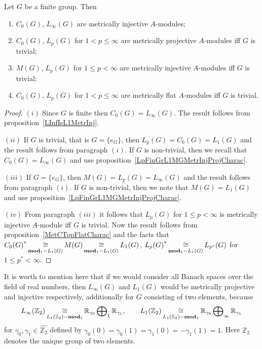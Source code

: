 \begin{proposition}\label{StdModFinGrL1MGMetrInjProjFlatCharac} Let $G$ be a
finite group. Then

\begin{enumerate}[label = (\roman*)]
    \item $C_0(G)$, $L_\infty(G)$ are metrically injective $A$-modules;

    \item $C_0(G)$, $L_p(G)$ for $1<p\leq\infty$ are metrically projective
    $A$-modules iff $G$ is trivial;

    \item $M(G)$, $L_p(G)$ for $1\leq p<\infty$ are metrically injective
    $A$-modules iff $G$ is trivial;

    \item $C_0(G)$, $L_p(G)$ for $1<p\leq\infty$ are metrically 
    flat $A$-modules iff $G$ is trivial.
\end{enumerate}
\end{proposition}
\begin{proof}
$(i)$ Since $G$ is finite then $C_0(G)=L_\infty(G)$. The result follows from
proposition~\ref{LInfIsL1MetrInj}.

$(ii)$ If $G$ is trivial, that is $G= \{e_G \}$, then $L_p(G)=C_0(G)=L_1(G)$ and
the result follows from paragraph $(i)$. If $G$ is non-trivial, then we recall
that $C_0(G)=L_\infty(G)$ and use
proposition~\ref{LpFinGrL1MGMetrInjProjCharac}.

$(iii)$ If $G= \{e_G \}$, then $M(G)=L_p(G)=L_\infty(G)$ and the result follows
from paragraph $(i)$. If $G$ is non-trivial, then we note that $M(G)=L_1(G)$ and
use proposition~\ref{LpFinGrL1MGMetrInjProjCharac}.

$(iv)$ From paragraph $(iii)$ it follows that $L_p(G)$ for $1\leq p<\infty$ is
metrically injective $A$-module iff $G$ is trivial. Now the result follows from
proposition~\ref{MetCTopFlatCharac} and the facts that
${C_0(G)}^*\mathop{\mathbin{\cong}}\limits_{\mathbf{mod}_1-L_1(G)}M(G)\mathop{\mathbin{\cong}}\limits_{\mathbf{mod}_1-L_1(G)}L_1(G)$,
${L_p(G)}^*\mathop{\mathbin{\cong}}\limits_{\mathbf{mod}_1-L_1(G)}L_{p^*}(G)$ for $1\leq p^*<\infty$.
\end{proof}

It is worth to mention here that if we would consider all Banach spaces over the
field of real numbers, then $L_\infty(G)$ and $L_1(G)$ would be metrically
projective and injective respectively,  additionally for $G$ consisting of two
elements, because
$$
L_\infty(\mathbb{Z}_2)
\mathop{\mathbin{\cong}}\limits_{L_1(\mathbb{Z}_2)-\mathbf{mod}_1}
\mathbb{R}_{\gamma_0}\bigoplus\nolimits_1\mathbb{R}_{\gamma_1},
\qquad
L_1(\mathbb{Z}_2)
\mathop{\mathbin{\cong}}\limits_{L_1(\mathbb{Z}_2)-\mathbf{mod}_1}
\mathbb{R}_{\gamma_0}\bigoplus\nolimits_\infty\mathbb{R}_{\gamma_1}
$$
for $\gamma_0,\gamma_1\in\widehat{\mathbb{Z}_2}$ defined by
$\gamma_0(0)=\gamma_0(1)=\gamma_1(0)=-\gamma_1(1)=1$. Here $\mathbb{Z}_2$
denotes the unique group of two elements.

